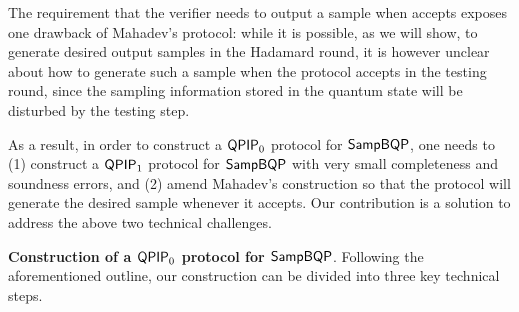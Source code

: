 

The requirement that the verifier needs to output a sample when accepts exposes one drawback of Mahadev's protocol: 
while it is possible, as we will show, to generate desired output samples in the Hadamard round, 
it is however unclear about how to generate such a sample when the protocol accepts in the testing round, since the sampling information stored in the quantum state will be disturbed by the testing step. 

As a result, in order to construct a $\operatorname{\mathsf{QPIP}}_0$ protocol for $\operatorname{\mathsf{SampBQP}}$,  one needs to (1) construct a $\operatorname{\mathsf{QPIP}}_1$ protocol for $\operatorname{\mathsf{SampBQP}}$ with very small completeness and soundness errors, and (2) amend Mahadev's construction so that the protocol will generate the desired sample whenever it accepts. 
Our contribution is a solution to address the above two technical challenges. 





\vspace{2mm} \noindent \textbf{Construction of a $\operatorname{\mathsf{QPIP}}_0$ protocol for $\operatorname{\mathsf{SampBQP}}$}. 
Following the aforementioned outline, our construction can be divided into three key technical steps. 

